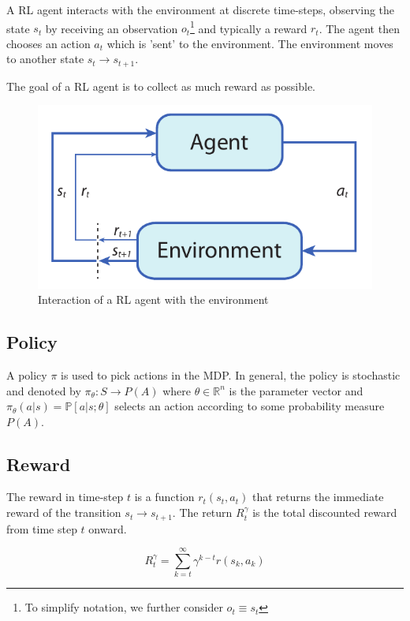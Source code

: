 A RL agent interacts with the environment at discrete time-steps, observing the state $s_t$ by receiving an observation $o_t$\footnote{To simplify notation, we further consider $o_t\equiv s_t$} and typically a reward $r_t$. The agent then chooses an action $a_t$ which is 'sent' to the environment. The environment moves to another state $s_t\to s_{t+1}$.

The goal of a RL agent is to collect as much reward as possible.

\begin{figure}
\includegraphics[width=\textwidth*\real{0.8}]{images/rl/rl_loop_blue.pdf}
\caption{Interaction of a RL agent with the environment}
\end{figure}

\subsection{Policy}
A policy $\pi$ is used to pick actions in the MDP. In general, the policy is stochastic and denoted by $\pi_\theta: S \to P(A)$ where $\theta \in \mathbb{R}^n$ is the parameter vector and $\pi_\theta(a|s)=\mathbb{P}[a|s;\theta]$ selects an action according to some probability measure $P(A)$.

\subsection{Reward}
The reward in time-step $t$ is a function $r_t(s_t,a_t)$ that returns the immediate reward of the transition $s_t\to s_{t+1}$.
The return $R_t^\gamma$ is the total discounted reward from time step $t$ onward.

\begin{equation}
R_t^\gamma=\sum_{k=t}^\infty \gamma^{k-t}r(s_k,a_k)
\end{equation}

